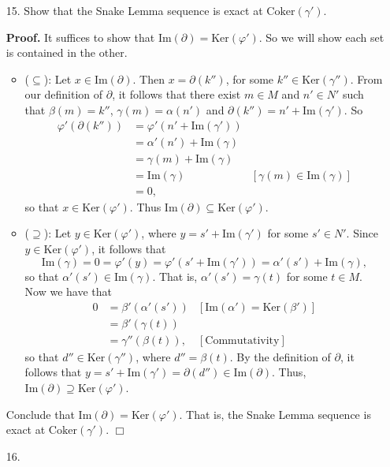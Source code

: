 \documentclass[9pt]{article}
\newcommand{\qed}{\hfill \ensuremath{\Box}}
\newcommand{\Ker}{\text{Ker}}
\newcommand{\Coker}{\text{Coker}}
\newcommand{\im}{\text{Im}}
\begin{document}
\begin{enumerate}
   \item[15.]  Show that the Snake Lemma sequence is exact at $\Coker(\gamma')$.

      \textbf{Proof.} It suffices to show that
      $\im(\partial) = \Ker(\varphi')$. So we will show each set is
      contained in the other.
      \begin{itemize}
         \item ($\subseteq$): Let $x \in \im(\partial)$. Then
               $x = \partial(k'')$, for some $k'' \in \Ker(\gamma'')$. From our
               definition of $\partial$, it follows that there exist $m \in M$
               and $n' \in N'$ such that $\beta(m) = k''$,
               $\gamma(m) = \alpha(n')$ and $\partial(k'') =n' + \im(\gamma')$.
               So
               \begin{align*}
                  \varphi'(\partial(k'')) &= \varphi'(n'+\im(\gamma')) \\
                     &= \alpha'(n') + \im(\gamma) \\
                     &= \gamma(m) + \im(\gamma) \\
                     &= \im(\gamma) &[\gamma(m) \in \im(\gamma)] \\
                     &= 0,
               \end{align*}
               so that $x \in \Ker(\varphi')$. Thus 
               $\im(\partial) \subseteq \Ker(\varphi')$.
         \item ($\supseteq$): Let $y \in \Ker(\varphi')$, where
               $y = s' + \im(\gamma')$ for some $s' \in N'$. Since
               $y \in \Ker(\varphi')$, it follows that
               $$\im(\gamma) = 0 = \varphi'(y) = \varphi'(s' + \im(\gamma')) =
                 \alpha'(s') + \im(\gamma),$$
               so that $\alpha'(s') \in \im(\gamma)$. That is,
               $\alpha'(s') = \gamma(t)$ for some $t \in M$. Now we have that
               \begin{align*}
                  0 &= \beta'(\alpha'(s')) &[\im(\alpha')=\Ker(\beta')] \\
                    &= \beta'(\gamma(t)) \\
                    &= \gamma''(\beta(t)), &[\text{Commutativity}]                    
               \end{align*}
               so that $d'' \in \Ker(\gamma'')$, where $d'' = \beta(t)$. By the
               definition of $\partial$, it follows that
               $y = s' + \im(\gamma') = \partial(d'') \in \im(\partial)$. Thus,
               $\im(\partial) \supseteq \Ker(\varphi')$.
      \end{itemize}
      Conclude that $\im(\partial) = \Ker(\varphi')$. That is, the
      Snake Lemma sequence is exact at $\Coker(\gamma')$. \qed
   \item[16.]  
\end{enumerate}
\end{document}
